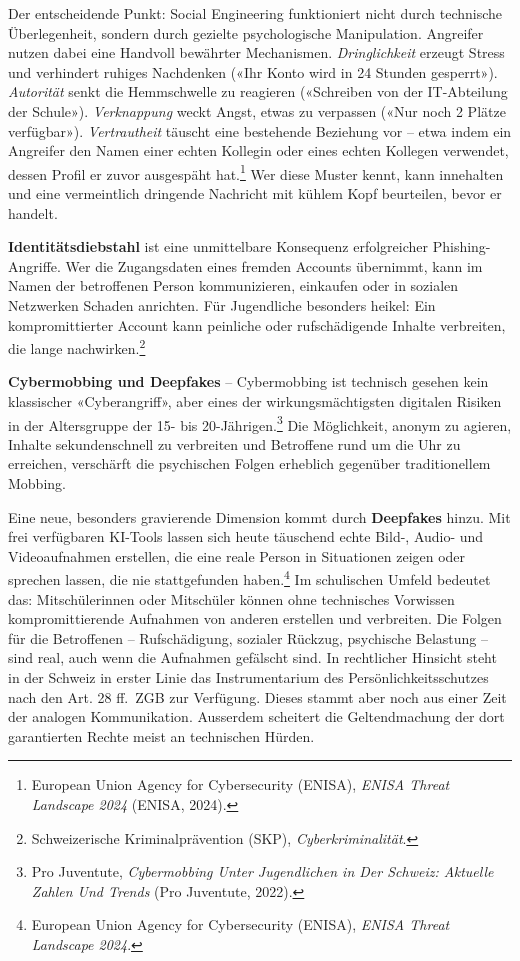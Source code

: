 \documentclass[
  nswissgerman,
  a4paper,
  DIV=11,
  numbers=noendperiod,
  ngerman]{scrreprt}
\begin{document}
Der entscheidende Punkt: Social Engineering funktioniert nicht durch
technische Überlegenheit, sondern durch gezielte psychologische
Manipulation. Angreifer nutzen dabei eine Handvoll bewährter
Mechanismen. \emph{Dringlichkeit} erzeugt Stress und verhindert ruhiges
Nachdenken («Ihr Konto wird in 24 Stunden gesperrt»). \emph{Autorität}
senkt die Hemmschwelle zu reagieren («Schreiben von der IT-Abteilung der
Schule»). \emph{Verknappung} weckt Angst, etwas zu verpassen («Nur noch
2 Plätze verfügbar»). \emph{Vertrautheit} täuscht eine bestehende
Beziehung vor -- etwa indem ein Angreifer den Namen einer echten
Kollegin oder eines echten Kollegen verwendet, dessen Profil er zuvor
ausgespäht hat.\footnote{European Union Agency for Cybersecurity
  (ENISA), \emph{{ENISA} Threat Landscape 2024} (ENISA, 2024).} Wer
diese Muster kennt, kann innehalten und eine vermeintlich dringende
Nachricht mit kühlem Kopf beurteilen, bevor er handelt.

\textbf{Identitätsdiebstahl} ist eine unmittelbare Konsequenz
erfolgreicher Phishing-Angriffe. Wer die Zugangsdaten eines fremden
Accounts übernimmt, kann im Namen der betroffenen Person kommunizieren,
einkaufen oder in sozialen Netzwerken Schaden anrichten. Für Jugendliche
besonders heikel: Ein kompromittierter Account kann peinliche oder
rufschädigende Inhalte verbreiten, die lange nachwirken.\footnote{Schweizerische
  Kriminalprävention (SKP), \emph{Cyberkriminalität}.}

\textbf{Cybermobbing und Deepfakes} -- Cybermobbing ist technisch
gesehen kein klassischer «Cyberangriff», aber eines der
wirkungsmächtigsten digitalen Risiken in der Altersgruppe der 15- bis
20-Jährigen.\footnote{Pro Juventute, \emph{Cybermobbing Unter
  Jugendlichen in Der Schweiz: {Aktuelle} Zahlen Und Trends} (Pro
  Juventute, 2022).} Die Möglichkeit, anonym zu agieren, Inhalte
sekundenschnell zu verbreiten und Betroffene rund um die Uhr zu
erreichen, verschärft die psychischen Folgen erheblich gegenüber
traditionellem Mobbing.

Eine neue, besonders gravierende Dimension kommt durch
\textbf{Deepfakes} hinzu. Mit frei verfügbaren KI-Tools lassen sich
heute täuschend echte Bild-, Audio- und Videoaufnahmen erstellen, die
eine reale Person in Situationen zeigen oder sprechen lassen, die nie
stattgefunden haben.\footnote{European Union Agency for Cybersecurity
  (ENISA), \emph{{ENISA} Threat Landscape 2024}.} Im schulischen Umfeld
bedeutet das: Mitschülerinnen oder Mitschüler können ohne technisches
Vorwissen kompromittierende Aufnahmen von anderen erstellen und
verbreiten. Die Folgen für die Betroffenen -- Rufschädigung, sozialer
Rückzug, psychische Belastung -- sind real, auch wenn die Aufnahmen
gefälscht sind. In rechtlicher Hinsicht steht in der Schweiz in erster
Linie das Instrumentarium des Persönlichkeitsschutzes nach den Art. 28
ff.~ZGB zur Verfügung. Dieses stammt aber noch aus einer Zeit der
analogen Kommunikation. Ausserdem scheitert die Geltendmachung der dort
garantierten Rechte meist an technischen Hürden.
\end{document}
